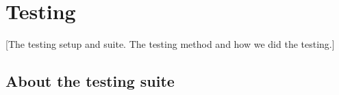 \section{Testing}\label{Testing}
    [The testing setup and suite. The testing method and how we did the testing.]
    
    
    \subsection{About the testing suite}\label{Testing:About}
        
        
            
